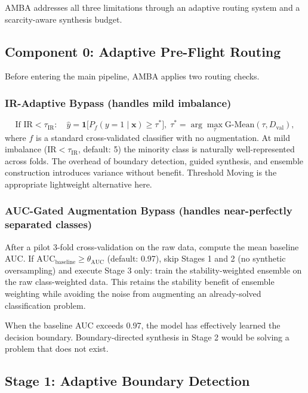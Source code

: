 \documentclass[11pt,a4paper]{article}
\newcommand{\Dval}{D_{\mathrm{val}}}
\newcommand{\IR}{\mathrm{IR}}
\begin{document}
AMBA addresses all three limitations through an adaptive routing system and a
scarcity-aware synthesis budget.

\subsection{Component 0: Adaptive Pre-Flight Routing}

Before entering the main pipeline, AMBA applies two routing checks.

\subsubsection*{IR-Adaptive Bypass (handles mild imbalance)}

\[
  \text{If } \IR < \tau_{\IR}: \quad
  \hat{y} = \mathbf{1}\!\bigl[P_f(y=1 \mid \mathbf{x}) \ge \tau^*\bigr],\;
  \tau^* = \arg\max_\tau \mathrm{G\text{-}Mean}(\tau, \Dval),
\]
where $f$ is a standard cross-validated classifier with no augmentation. At mild imbalance
($\IR < \tau_{\IR}$, default: 5) the minority class is naturally well-represented across folds.
The overhead of boundary detection, guided synthesis, and ensemble construction introduces
variance without benefit. Threshold Moving is the appropriate lightweight alternative here.

\subsubsection*{AUC-Gated Augmentation Bypass (handles near-perfectly separated classes)}

After a pilot 3-fold cross-validation on the raw data, compute the mean baseline AUC. If
$\mathrm{AUC}_{\mathrm{baseline}} \ge \theta_{\mathrm{AUC}}$ (default: 0.97), skip Stages 1
and 2 (no synthetic oversampling) and execute Stage 3 only: train the stability-weighted
ensemble on the raw class-weighted data. This retains the stability benefit of ensemble
weighting while avoiding the noise from augmenting an already-solved classification problem.

When the baseline AUC exceeds 0.97, the model has effectively learned the decision boundary.
Boundary-directed synthesis in Stage 2 would be solving a problem that does not exist.

\subsection{Stage 1: Adaptive Boundary Detection}
\end{document}
